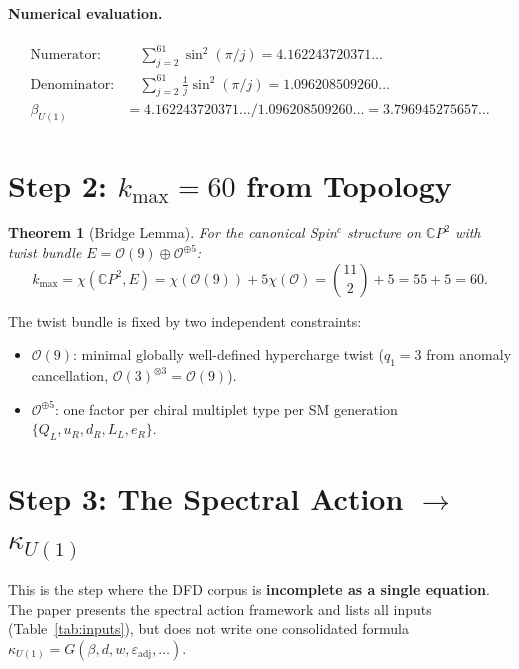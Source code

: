\documentclass[11pt,a4paper]{article}
\newtheorem{theorem}{Theorem}
\theoremstyle{definition}
\begin{document}
\paragraph{Numerical evaluation.}
\begin{align}
\text{Numerator:} &\quad \sum_{j=2}^{61}\sin^2(\pi/j) = 4.162243720371\ldots \\
\text{Denominator:} &\quad \sum_{j=2}^{61}\frac{1}{j}\sin^2(\pi/j) = 1.096208509260\ldots \\
\beta_{U(1)} &= 4.162243720371\ldots / 1.096208509260\ldots = 3.796945275657\ldots
\end{align}

\section{Step 2: $k_{\max} = 60$ from Topology}

\begin{theorem}[Bridge Lemma]
For the canonical Spin$^c$ structure on $\mathbb{C}P^2$ with twist bundle
$E = \mathcal{O}(9) \oplus \mathcal{O}^{\oplus 5}$:
\begin{equation}
k_{\max} = \chi(\mathbb{C}P^2, E) = \chi(\mathcal{O}(9)) + 5\chi(\mathcal{O})
= \binom{11}{2} + 5 = 55 + 5 = 60.
\end{equation}
\end{theorem}

\noindent The twist bundle is fixed by two independent constraints:
\begin{itemize}
\item $\mathcal{O}(9)$: minimal globally well-defined hypercharge twist
($q_1 = 3$ from anomaly cancellation, $\mathcal{O}(3)^{\otimes 3} = \mathcal{O}(9)$).
\item $\mathcal{O}^{\oplus 5}$: one factor per chiral multiplet type per SM generation
$\{Q_L, u_R, d_R, L_L, e_R\}$.
\end{itemize}

\section{Step 3: The Spectral Action $\to$ $\kappa_{U(1)}$}

This is the step where the DFD corpus is \textbf{incomplete as a single equation}.
The paper presents the spectral action framework and lists all inputs
(Table~\ref{tab:inputs}), but does not write one consolidated formula
$\kappa_{U(1)} = G(\beta, d, w, \varepsilon_{\mathrm{adj}}, \ldots)$.
\end{document}
